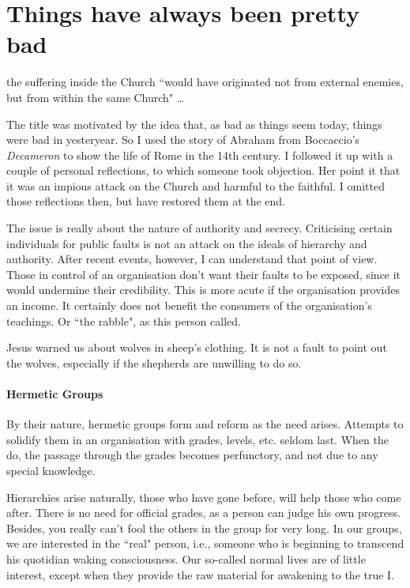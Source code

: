 \section{Things have always been pretty bad}

\begin{quotex}
the suffering inside the Church ``would have originated not from external enemies, but from within the same Church" …

\end{quotex}
The title was motivated by the idea that, as bad as things seem today, things were bad in yesteryear. So I used the
story of Abraham from Boccaccio's \emph{Decameron} to show the life of Rome in the 14th century. I
followed it up with a couple of personal reflections, to which someone took objection. Her point it that it was an
impious attack on the Church and harmful to the faithful. I omitted those reflections then, but have restored them at
the end.

The issue is really about the nature of authority and secrecy. Criticising certain individuals for public faults is not
an attack on the ideals of hierarchy and authority. After recent events, however, I can understand that point of view.
Those in control of an organisation don't want their faults to be exposed, since it would
undermine their credibility. This is more acute if the organisation provides an income. It certainly does not benefit
the consumers of the organisation's teachings. Or ``the rabble", as this person called.

Jesus warned us about wolves in sheep's clothing. It is not a fault to point out the wolves,
especially if the shepherds are unwilling to do so.

\paragraph{Hermetic Groups}
By their nature, hermetic groups form and reform as the need arises. Attempts to solidify them in an organisation with
grades, levels, etc. seldom last. When the do, the passage through the grades becomes perfunctory, and not due to any
special knowledge.

Hierarchies arise naturally, those who have gone before, will help those who come after. There is no need for official
grades, as a person can judge his own progress. Besides, you really can't fool the others in the
group for very long. In our groups, we are interested in the ``real" person, i.e., someone who is beginning to transcend
his quotidian waking consciousness. Our so-called normal lives are of little interest, except when they provide the raw
material for awakening to the true I.

